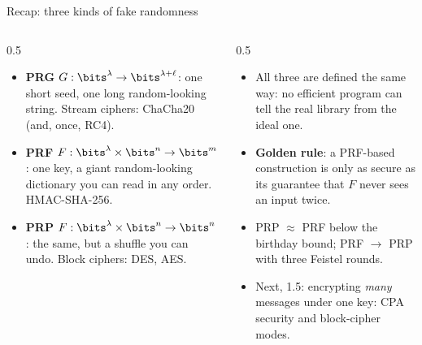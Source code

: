 \ifdefined\PRESENTATION\else\PassOptionsToClass{handout}{beamer}\fi\documentclass[aspectratio=169, lualatex]{beamer}
\begin{document}
\begin{frame}{Recap: three kinds of fake randomness}
	\begin{columns}[c]
		\begin{column}{0.5\textwidth}
			\begin{itemize}
				\item \textbf{PRG} $G: \bits^\lambda \rightarrow \bits^{\lambda+\ell}$: one short seed, one long random-looking string. Stream ciphers: ChaCha20 (and, once, RC4).
				\item \textbf{PRF} $F: \bits^\lambda \times \bits^n \rightarrow \bits^m$: one key, a giant random-looking dictionary you can read in any order. HMAC-SHA-256.
				\item \textbf{PRP} $F: \bits^\lambda \times \bits^n \rightarrow \bits^n$: the same, but a shuffle you can undo. Block ciphers: DES, AES.
			\end{itemize}
		\end{column}
		\begin{column}{0.5\textwidth}
			\begin{itemize}
				\item All three are defined the same way: no efficient program can tell the real library from the ideal one.
				\item \textbf{Golden rule}: a PRF-based construction is only as secure as its guarantee that $F$ never sees an input twice.
				\item PRP $\approx$ PRF below the birthday bound; PRF $\rightarrow$ PRP with three Feistel rounds.
				\item Next, 1.5: encrypting \emph{many} messages under one key: CPA security and block-cipher modes.
			\end{itemize}
		\end{column}
	\end{columns}
\end{frame}

\begin{frame}[plain]
	\titlepage
\end{frame}
\end{document}
